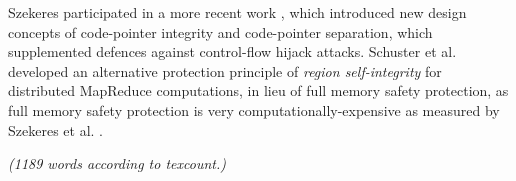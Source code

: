 \documentclass[11pt]{article}
\begin{document}
Szekeres participated in a more recent work \cite{kuznetsov2014code}, which introduced new design concepts of code-pointer integrity and code-pointer separation, which supplemented defences against control-flow hijack attacks. Schuster et al. \cite{schuster2015vc3} developed an alternative protection principle of \emph{region self-integrity} for distributed MapReduce computations, in lieu of full memory safety protection, as full memory safety protection is very computationally-expensive as measured by Szekeres et al. \cite{szekeres2013sok}. 

\emph{(1189 words according to texcount.)}


\footnotesize{}
\end{document}
